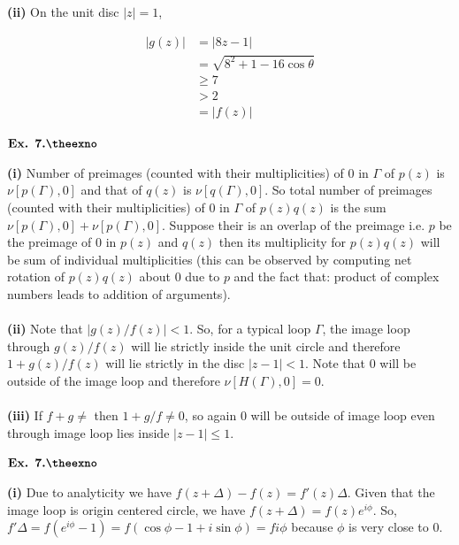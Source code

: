 \documentclass{article}
\def\tf{\textbf}
\newcounter{exno}
\begin{document}
\tf{(ii)} On the unit disc $|z|=1$,

\begin{align*}
    |g(z)| &= |8z-1|\\
    &= \sqrt{8^2+1-16\cos\theta}\\
    &\geq 7\\
    &> 2\\
    &= |f(z)|
\end{align*}

\vspace{0.2in}

${\textbf{Ex. 7.\theexno}}$
\addtocounter{exno}{1}

\tf{(i)} Number of preimages (counted with their multiplicities) of $0$ in $\Gamma$ of $p(z)$ is $\nu[p(\Gamma),0]$ and that of $q(z)$ is $\nu[q(\Gamma),0]$. So total number of preimages (counted with their multiplicities) of $0$ in $\Gamma$ of $p(z)q(z)$ is the sum $\nu[p(\Gamma),0] + \nu[p(\Gamma),0]$. Suppose their is an overlap of the preimage i.e. $p$ be the preimage of $0$ in $p(z)$ and $q(z)$ then its multiplicity for $p(z)q(z)$ will be sum of individual multiplicities (this can be observed by computing net rotation of $p(z)q(z)$ about $0$ due to $p$ and the fact that: product of complex numbers leads to addition of arguments).\\~\\

\tf{(ii)} Note that $|g(z)/f(z)| < 1$. So, for a typical loop $\Gamma$, the image loop through $g(z)/f(z)$ will lie strictly inside the unit circle and therefore $1+g(z)/f(z)$ will lie strictly in the disc $|z-1|<1$. Note that $0$ will be outside of the image loop and therefore $\nu[H(\Gamma),0] = 0$.\\~\\

\tf{(iii)} If $f+g\neq$ then $1+g/f \neq 0$, so again $0$ will be outside of image loop even through image loop lies inside $|z-1|\leq 1$.

\vspace{0.2in}

${\textbf{Ex. 7.\theexno}}$
\addtocounter{exno}{1}

\tf{(i)} Due to analyticity we have $f(z+\Delta)-f(z) = f'(z)\Delta$. Given that the image loop is origin centered circle, we have $f(z+\Delta)=f(z)e^{i\phi}$. So, $f'\Delta = f(e^{i\phi}-1) = f(\cos\phi - 1 + i\sin\phi) = fi\phi$ because $\phi$ is very close to $0$.\\~\\
\end{document}

